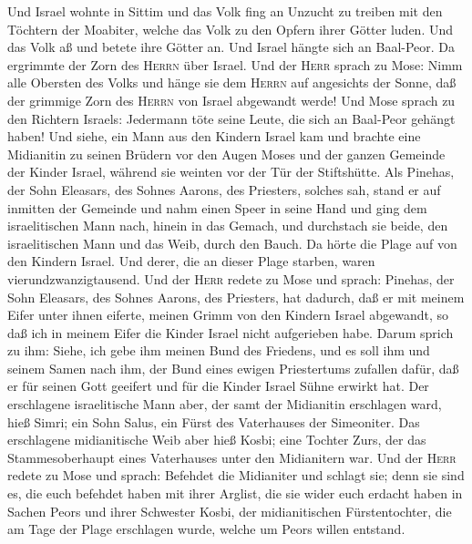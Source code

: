  Und Israel wohnte in Sittim und das Volk fing an Unzucht
zu treiben mit den Töchtern der Moabiter,  welche das Volk
zu den Opfern ihrer Götter luden. Und das Volk aß und betete ihre Götter
an.  Und Israel hängte sich an Baal-Peor. Da ergrimmte der
Zorn des \textsc{Herrn} über Israel.  Und der
\textsc{Herr} sprach zu Mose: Nimm alle Obersten des Volks und hänge sie
dem \textsc{Herrn} auf angesichts der Sonne, daß der grimmige Zorn des
\textsc{Herrn} von Israel abgewandt werde!  Und Mose
sprach zu den Richtern Israels: Jedermann töte seine Leute, die sich an
Baal-Peor gehängt haben!  Und siehe, ein Mann aus den
Kindern Israel kam und brachte eine Midianitin zu seinen Brüdern vor den
Augen Moses und der ganzen Gemeinde der Kinder Israel, während sie
weinten vor der Tür der Stiftshütte.  Als Pinehas, der
Sohn Eleasars, des Sohnes Aarons, des Priesters, solches sah, stand er
auf inmitten der Gemeinde und nahm einen Speer in seine Hand
 und ging dem israelitischen Mann nach, hinein in das
Gemach, und durchstach sie beide, den israelitischen Mann und das Weib,
durch den Bauch. Da hörte die Plage auf von den Kindern Israel.
 Und derer, die an dieser Plage starben, waren
vierundzwanzigtausend.  Und der \textsc{Herr} redete zu
Mose und sprach:  Pinehas, der Sohn Eleasars, des Sohnes
Aarons, des Priesters, hat dadurch, daß er mit meinem Eifer unter ihnen
eiferte, meinen Grimm von den Kindern Israel abgewandt, so daß ich in
meinem Eifer die Kinder Israel nicht aufgerieben habe. 
Darum sprich zu ihm: Siehe, ich gebe ihm meinen Bund des Friedens,
 und es soll ihm und seinem Samen nach ihm, der Bund
eines ewigen Priestertums zufallen dafür, daß er für seinen Gott
geeifert und für die Kinder Israel Sühne erwirkt hat. 
Der erschlagene israelitische Mann aber, der samt der Midianitin
erschlagen ward, hieß Simri; ein Sohn Salus, ein Fürst des Vaterhauses
der Simeoniter.  Das erschlagene midianitische Weib aber
hieß Kosbi; eine Tochter Zurs, der das Stammesoberhaupt eines
Vaterhauses unter den Midianitern war.  Und der
\textsc{Herr} redete zu Mose und sprach:  Befehdet die
Midianiter und schlagt sie;  denn sie sind es, die euch
befehdet haben mit ihrer Arglist, die sie wider euch erdacht haben in
Sachen Peors und ihrer Schwester Kosbi, der midianitischen
Fürstentochter, die am Tage der Plage erschlagen wurde, welche um Peors
willen entstand.

